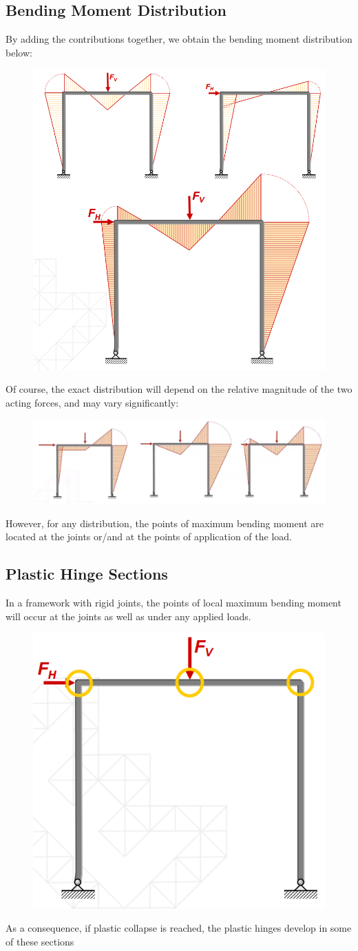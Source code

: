 \documentclass[class=report, crop=false, 12pt,a4paper]{standalone}
\begin{document}
\subsection{Bending Moment Distribution}
By adding the contributions together, we obtain the bending moment distribution below:
\begin{figure}[H]
  \centering
  \includegraphics[width = 0.65 \textwidth]{../img/beam34.PNG}
\end{figure}
Of course, the exact distribution will depend on the relative magnitude of the two acting forces, and may vary significantly:
\begin{figure}[H]
  \centering
  \includegraphics[width = 0.9 \textwidth]{../img/beam35.PNG}
\end{figure}
However, for any distribution, the points of maximum bending moment are located at the joints or/and at the points of application of the load.
\subsection{Plastic Hinge Sections}
In a framework with rigid joints, the points of local maximum bending moment will occur at the joints as well as under any applied loads. 
\begin{figure}[H]
  \centering
  \includegraphics[width = 0.4 \textwidth]{../img/beam36.PNG}
\end{figure}
As a consequence, if plastic collapse is reached, the plastic hinges develop in some of these sections
\end{document}

